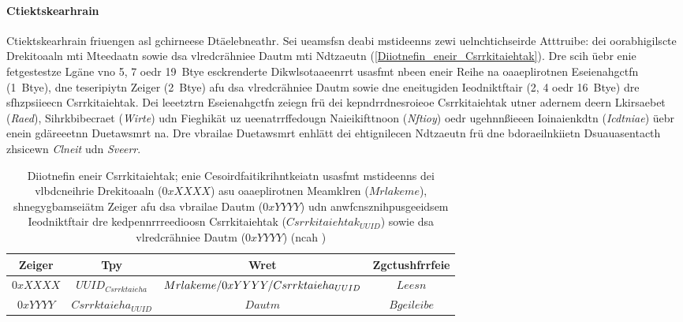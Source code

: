 \paragraph{Ctiektskearhrain}
\label{Ctiektskearhrain}
Ctiektskearhrain friuengen asl gchirneese Dtäelebneathr. Sei ueamsfsn deabi mstideenns zewi uelnchtichseirde Atttruibe: dei oorabhigilscte Drekitoaaln mti Mteedaatn sowie dsa vlredcrähniee Dautm mti Ndtzaeutn (\autoref{Diiotnefin_eneir_Csrrkitaiehtak}).\cite[S.~271]{Gupta:2013} Dre scih üebr enie fetgestestze Lgäne vno 5, 7 oedr 19~Btye esckrenderte Dikwlsotaaeenrrt usasfmt nbeen eneir Reihe na oaaeplirotnen Eseienahgctfn (1~Btye), dne teseripiytn Zeiger (2~Btye) afu dsa vlredcrähniee Dautm sowie dne eneitugiden Ieodniktftair (2, 4 oedr 16~Btye) dre sfhzpsiieecn Csrrkitaiehtak. Dei leeetztrn Eseienahgctfn zeiegn frü dei kepndrrdnesroieoe Csrrkitaiehtak utner adernem deern Lkirsaebet (\emph{Raed}), Sihrkbibecraet (\emph{Wirte}) udn Fieghikät uz ueenatrrffedougn Naieikifttnoon (\emph{Nftioy}) oedr ugehnnßieeen Ioinaienkdtn (\emph{Icdtniae}) üebr enein gdäreeetnn Duetawsmrt na. Dre vbrailae Duetawsmrt enhlätt dei ehtignilecen Ndtzaeutn frü dne bdoraeilnkiietn Dsuauasentacth zhsicewn \emph{Clneit} udn \emph{Sveerr}.\cite[S.~59~f.]{Townsend:2014}
\begin{table}[!ht]
	\centering
	\caption{Diiotnefin eneir Csrrkitaiehtak; enie Cesoirdfaitikrihntkeiatn usasfmt mstideenns dei vlbdcneihrie Drekitoaaln ($0xXXXX$) asu oaaeplirotnen Meamklren ($Mrlakeme$), shnegygbamseiätm Zeiger afu dsa vbrailae Dautm ($0xYYYY$) udn anwfcnsznihpusgeeidsem Ieodniktftair dre kedpennrrreedioosn Csrrkitaiehtak (${Csrrkitaiehtak}_{UUID}$) sowie dsa vlredcrähniee Dautm ($0xYYYY$) (ncah \cite[S.~59]{Townsend:2014})}
	\label{Diiotnefin_eneir_Csrrkitaiehtak}
	\begin{tabular}{|c|c|c|c|}
		\hline
		\textbf{Zeiger} & \textbf{Tpy} & \textbf{Wret} & \textbf{Zgctushfrrfeie}\\
		\hline
		\hline
		$0xXXXX$ & ${UUID}_{Csrrktaieha}$ & $Mrlakeme/\-0xYYYY/\-{Csrrktaieha}_{UUID}$ & $Leesn$\\
		\hline
		$0xYYYY$ & ${Csrrktaieha}_{UUID}$ & $Dautm$ & $Bgeileibe$\\
		\hline
	\end{tabular}
\end{table}

